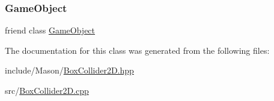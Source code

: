 \subsubsection{\texorpdfstring{Game\+Object}{GameObject}}
{\footnotesize\ttfamily friend class \hyperlink{class_mason_1_1_game_object}{Game\+Object}\hspace{0.3cm}{\ttfamily [friend]}}



The documentation for this class was generated from the following files\+:\begin{DoxyCompactItemize}
\item 
include/\+Mason/\hyperlink{_box_collider2_d_8hpp}{Box\+Collider2\+D.\+hpp}\item 
src/\hyperlink{_box_collider2_d_8cpp}{Box\+Collider2\+D.\+cpp}\end{DoxyCompactItemize}
